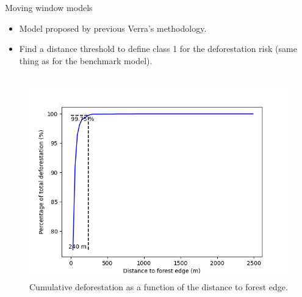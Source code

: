 \documentclass[10pt,table,dvipsnames,compress]{beamer}
\begin{document}
\begin{frame}[label={sec:orgd351244}]{Moving window models}
\begin{itemize}
\item Model proposed by previous Verra's methodology.
\item Find a distance threshold to define class 1 for the deforestation risk (same thing as for the benchmark model).
\end{itemize}

\begin{columns}
\begin{column}{0.55\columnwidth}
\begin{figure}[htbp]
\centering
\includegraphics[width=\textwidth]{figs/get_started/perc_dist.png}
\caption{Cumulative deforestation as a function of the distance to forest edge.}
\end{figure}
\end{column}


\end{columns}
\end{frame}
\end{document}
